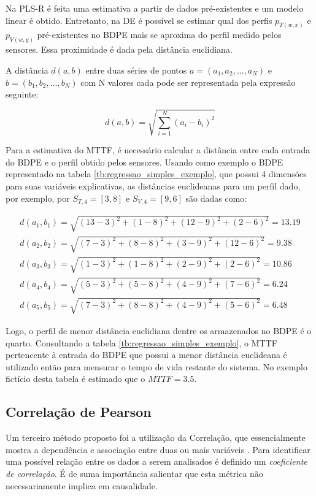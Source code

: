 Na PLS-R é feita uma estimativa a partir de dados pré-existentes e um modelo linear é obtido. Entretanto, na DE é possível se estimar qual dos perfis $p_{T(w,x)}$ e $p_{V(w,y)}$ pré-existentes no BDPE mais se aproxima do perfil medido pelos sensores. Essa proximidade é dada pela distância euclidiana.

A distância $d(a,b)$ entre duas séries de pontos $a=(a_1,a_2,\dots,a_N)$ e $b=(b_1,b_2,\dots,b_N)$ com N valores cada pode ser representada pela expressão seguinte:

\begin{equation}
d(a,b)=\sqrt{\sum_{i=1}^{N}(a_i-b_i)^2}
\label{eq:dist_euclideana}
\end{equation}

Para a estimativa do MTTF, é necessário calcular a distância entre cada entrada do BDPE e o perfil obtido pelos sensores. Usando como exemplo o BDPE representado na tabela \ref{tb:regressao_simples_exemplo}, que possui 4 dimensões para suas variáveis explicativas, as distâncias euclideanas para um perfil dado, por exemplo, por $S_{T,4} = [3,8]$ e $S_{V,4} = [9,6]$ são dadas como:

\begin{align}
d(a_1,b_1) = \sqrt{(13-3)^2+(1-8)^2+(12-9)^2+(2-6)^2} = 13.19 \\
d(a_2,b_2) = \sqrt{(7-3)^2+(8-8)^2+(3-9)^2+(12-6)^2} = 9.38 \\
d(a_3,b_3) = \sqrt{(1-3)^2+(1-8)^2+(2-9)^2+(2-6)^2} = 10.86 \\
d(a_4,b_4) = \sqrt{(5-3)^2+(5-8)^2+(4-9)^2+(7-6)^2} = 6.24 \\
d(a_5,b_5) = \sqrt{(7-3)^2+(8-8)^2+(4-9)^2+(5-6)^2} = 6.48
\end{align}

Logo, o perfil de menor distância euclidiana dentre os armazenados no BDPE é o quarto. Consultando a tabela \ref{tb:regressao_simples_exemplo}, o MTTF pertencente à entrada do BDPE que possui a menor distância euclideana é utilizado então para mensurar o tempo de vida restante do sistema. No exemplo fictício desta tabela é estimado que o $MTTF=3.5$.
\subsection{Correlação de Pearson}
\label{subsection_estimativas_correlacao}
Um terceiro método proposto foi a utilização da Correlação, que essencialmente mostra a dependência e associação entre duas ou mais variáveis \cite{Rodgers1988}. Para identificar uma possível relação entre os dados a serem analisados é definido um \textit{coeficiente de correlação}. É de suma importância salientar que esta métrica não necessariamente implica em causalidade.

